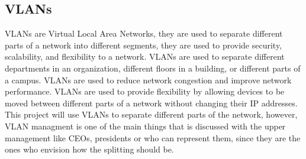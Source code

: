 \documentclass[12pt]{report}
\begin{document}
\subsection{VLANs}
VLANs are Virtual Local Area Networks, they are used to separate different parts of a network into different segments, they are used to provide security, scalability, and flexibility to a network. VLANs are used to separate different departments in an organization, different floors in a building, or different parts of a campus. VLANs are used to reduce network congestion and improve network performance. VLANs are used to provide flexibility by allowing devices to be moved between different parts of a network without changing their IP addresses. This project will use VLANs to separate different parts of the network, however, VLAN managment is one of the main things that is discussed with the upper management like CEOs, presidents or who can represent them, since they are the ones who envision how the splitting should be. \cite{VLAN}
\end{document}
